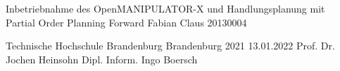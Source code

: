




  \JMUTitle
      {Inbetriebnahme des OpenMANIPULATOR-X und Handlungsplanung mit\\ Partial Order Planning Forward}        %
      {Fabian Claus}                        %
      {20130004}
      
      {Technische Hochschule Brandenburg}  %
      {Brandenburg 2021}                          %
      {13.01.2022}                              %
      {Prof. Dr. Jochen Heinsohn}               %
      {Dipl. Inform. Ingo Boersch}                          %

  \clearpage

  
  
  \lhead{}
  \setcounter{page}{1}

  \tableofcontents
  \clearpage



{} %
\listoffigures

